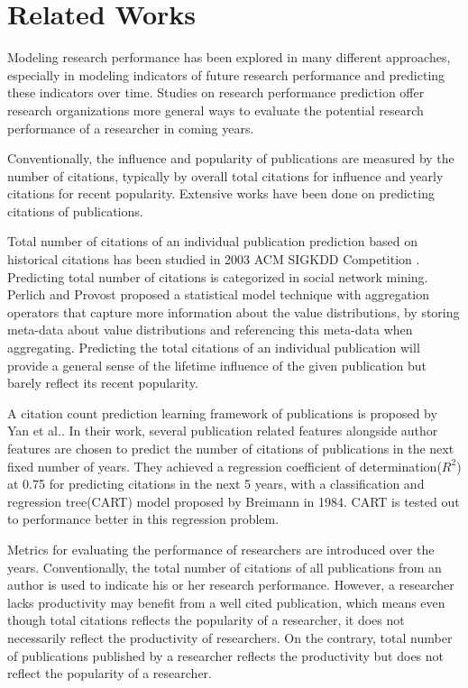 \section{Related Works}
Modeling research performance has been explored in many different approaches, especially in modeling indicators of future research performance and predicting these indicators over time. Studies on research performance prediction offer research organizations more general ways to evaluate the potential research performance of a researcher in coming years.

Conventionally, the influence and popularity of publications are measured by the number of citations, typically by overall total citations for influence and yearly citations for recent popularity. Extensive works have been done on predicting citations of publications.

Total number of citations of an individual publication prediction based on historical citations has been studied in 2003 ACM SIGKDD Competition \cite{gehrke2003overview}. Predicting total number of citations is categorized in social network mining. Perlich and Provost proposed a statistical model technique with aggregation operators that capture more information about the value distributions, by storing meta-data about value distributions and referencing this meta-data when aggregating\cite{perlich2003aggregation}. Predicting the total citations of an individual publication will provide a general sense of the lifetime influence of the given publication but barely reflect its recent popularity.

A citation count prediction learning framework of publications is proposed by Yan et al.\cite{yan2011citation}. In their work, several publication related features alongside author features are chosen to predict the number of citations of publications in the next fixed number of years. They achieved a regression coefficient of determination($R^2$) at 0.75 for predicting citations in the next 5 years, with a classification and regression tree(CART) model proposed by Breimann in 1984\cite{breiman1984classification}. CART is tested out to performance better in this regression problem.

Metrics for evaluating the performance of researchers are introduced over the years. Conventionally, the total number of citations of all publications from an author is used to indicate his or her research performance. However, a researcher lacks productivity may benefit from a well cited publication, which means even though total citations reflects the popularity of a researcher, it does not necessarily reflect the productivity of researchers.
On the contrary, total number of publications published by a researcher reflects the productivity but does not reflect the popularity of a researcher.

